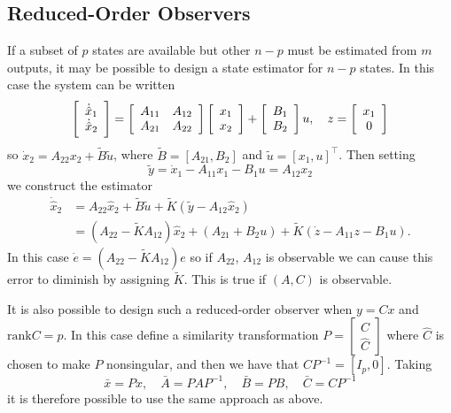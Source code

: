 \documentclass{report}
\begin{document}
\subsection{Reduced-Order Observers}
If a subset of $p$ states are available but other $n - p$ must be
estimated from $m$ outputs, it may be possible to design a state
estimator for $n - p$ states. In this case the system can be written
$$
\left[\begin{array}{c}
  \dot{\hat{x}}_1  \\
  \dot{\hat{x}}_2
\end{array}\right]
=
\left[\begin{array}{c c}
  A_{11} & A_{12} \\
  A_{21} & A_{22}
\end{array}\right]
\left[\begin{array}{c}
  x_1 \\
  x_2
\end{array}\right]
+
\left[\begin{array}{c c}
  B_1 \\
  B_2
\end{array}\right] u, \quad
z =
\left[\begin{array}{c}
  x_1 \\
  0
\end{array}\right]
$$
so $\dot{x}_2 = A_{22} x_2 + \tilde{B}\tilde{u}$, where
$\tilde{B} = [A_{21}, B_2]$ and $\tilde{u} = [x_1, u]^\top$. Then
setting
$$
\tilde{y} = \dot{x}_1 - A_{11} x_1 - B_1 u = A_{12} x_2
$$
we construct the estimator
\begin{align*}
\dot{\hat{x}}_2
 &= A_{22} \hat{x}_2
  + \tilde{B} \tilde{u}
  + \tilde{K} (\tilde{y} - A_{12} \hat{x}_2) \\
 &= (A_{22} - \tilde{K} A_{12}) \hat{x}_2
  + (A_{21} + B_2 u)
  + \tilde{K} (\dot{z} - A_{11} z - B_1 u).
\end{align*}
In this case $\dot{e} = (A_{22} - \tilde{K}A_{12})e$ so if $A_{22}$,
$A_{12}$ is observable we can cause this error to diminish by
assigning $\tilde{K}$. This is true if $(A, C)$ is observable.

It is also possible to design such a reduced-order observer when
$y = Cx$ and $\mathrm{rank} C = p$. In this case define a similarity
transformation
$
P =
\left[\begin{array}{c}
  C       \\
  \hat{C}
\end{array}\right]
$
where $\hat{C}$ is chosen to make $P$ nonsingular, and then we have
that $CP^{-1} = [I_p, 0]$. Taking
$$
\bar{x} = P x, \quad
\bar{A} = P A P^{-1}, \quad
\bar{B} = P B, \quad
\bar{C} = C P^{-1}
$$
it is therefore possible to use the same approach as above.
\end{document}

